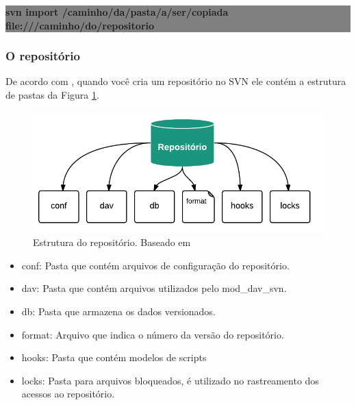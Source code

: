 \begin{centering}

\colorbox{Gray}{
\begin{minipage}{450px}
  \textbf{svn import /caminho/da/pasta/a/ser/copiada file:///caminho/do/repositorio}

\end{minipage}
}
\end{centering}

\subsubsection{O repositório}

De acordo com , quando você cria um repositório no SVN ele contém a estrutura de pastas da Figura \ref{fig:estrutura}.

\begin{figure}[!htb]
\centering
\includegraphics[scale=1]{figuras/repositorio.png}
\caption{Estrutura do repositório. Baseado em \cite{svn-book}}
\label{fig:estrutura}
\end{figure}

\pagebreak
\label{estrutura}
\begin{itemize}

\item conf: Pasta que contém arquivos de configuração do repositório.

\item dav: Pasta que contém arquivos utilizados pelo mod\_dav\_svn.

\item db: Pasta que armazena os dados versionados.

\item format: Arquivo que indica o número da versão do repositório.

\item hooks: Pasta que contém modelos de scripts

\item locks: Pasta para arquivos bloqueados, é utilizado no rastreamento dos acessos ao repositório.

\end{itemize}


